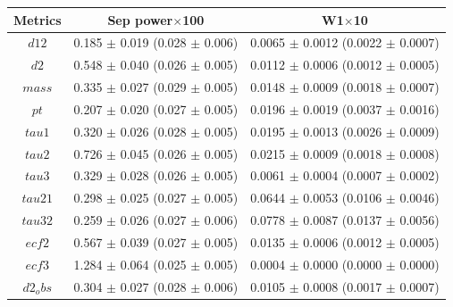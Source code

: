 \begin{ruledtabular}
  \begin{tabular}{ccc}
  \textbf{Metrics} & \textbf{Sep power}$\times$100 & \textbf{W1}$\times$10 \\
  \hline
  \textbf{$d12$} & 0.185 $\pm$ 0.019 (0.028 $\pm$ 0.006) & 0.0065 $\pm$ 0.0012 (0.0022 $\pm$ 0.0007) \\
  \textbf{$d2$} & 0.548 $\pm$ 0.040 (0.026 $\pm$ 0.005) & 0.0112 $\pm$ 0.0006 (0.0012 $\pm$ 0.0005) \\
  \textbf{$mass$} & 0.335 $\pm$ 0.027 (0.029 $\pm$ 0.005) & 0.0148 $\pm$ 0.0009 (0.0018 $\pm$ 0.0007) \\
  \textbf{$pt$} & 0.207 $\pm$ 0.020 (0.027 $\pm$ 0.005) & 0.0196 $\pm$ 0.0019 (0.0037 $\pm$ 0.0016) \\
  \textbf{$tau1$} & 0.320 $\pm$ 0.026 (0.028 $\pm$ 0.005) & 0.0195 $\pm$ 0.0013 (0.0026 $\pm$ 0.0009) \\
  \textbf{$tau2$} & 0.726 $\pm$ 0.045 (0.026 $\pm$ 0.005) & 0.0215 $\pm$ 0.0009 (0.0018 $\pm$ 0.0008) \\
  \textbf{$tau3$} & 0.329 $\pm$ 0.028 (0.026 $\pm$ 0.005) & 0.0061 $\pm$ 0.0004 (0.0007 $\pm$ 0.0002) \\
  \textbf{$tau21$} & 0.298 $\pm$ 0.025 (0.027 $\pm$ 0.005) & 0.0644 $\pm$ 0.0053 (0.0106 $\pm$ 0.0046) \\
  \textbf{$tau32$} & 0.259 $\pm$ 0.026 (0.027 $\pm$ 0.006) & 0.0778 $\pm$ 0.0087 (0.0137 $\pm$ 0.0056) \\
  \textbf{$ecf2$} & 0.567 $\pm$ 0.039 (0.027 $\pm$ 0.005) & 0.0135 $\pm$ 0.0006 (0.0012 $\pm$ 0.0005) \\
  \textbf{$ecf3$} & 1.284 $\pm$ 0.064 (0.025 $\pm$ 0.005) & 0.0004 $\pm$ 0.0000 (0.0000 $\pm$ 0.0000) \\
  \textbf{$d2_obs$} & 0.304 $\pm$ 0.027 (0.028 $\pm$ 0.006) & 0.0105 $\pm$ 0.0008 (0.0017 $\pm$ 0.0007) \\
  \end{tabular}
\end{ruledtabular}